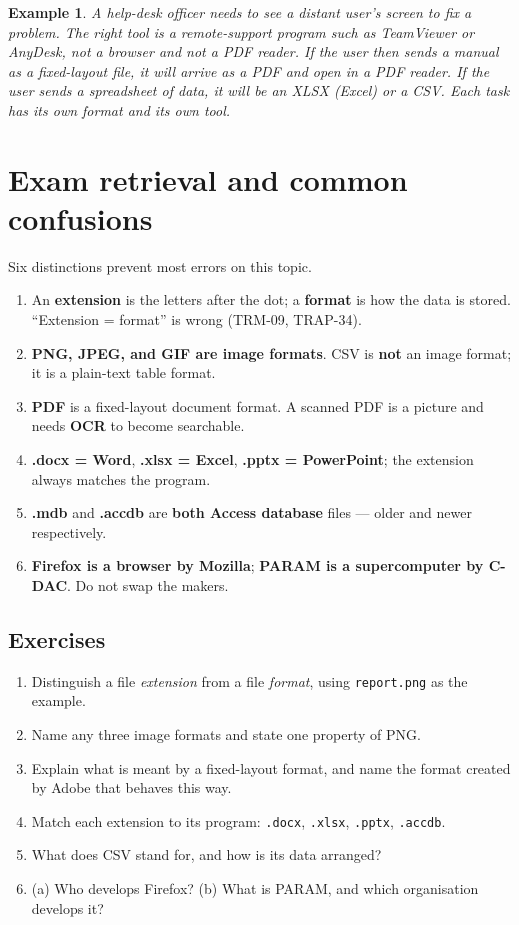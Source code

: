 \documentclass[11pt]{article}
\newtheorem{example}{Example}[section]
\begin{document}
\begin{example}
A help-desk officer needs to see a distant user's screen to fix a problem.
The right tool is a remote-support program such as TeamViewer or AnyDesk,
\emph{not} a browser and \emph{not} a PDF reader. If the user then sends a
manual as a fixed-layout file, it will arrive as a PDF and open in a PDF
reader. If the user sends a spreadsheet of data, it will be an XLSX (Excel)
or a CSV. Each task has its own format and its own tool.
\end{example}

\section{Exam retrieval and common confusions}
Six distinctions prevent most errors on this topic.
\begin{enumerate}
  \item An \textbf{extension} is the letters after the dot; a \textbf{format}
    is how the data is stored. ``Extension = format'' is wrong (TRM-09,
    TRAP-34).
  \item \textbf{PNG, JPEG, and GIF are image formats}. CSV is \textbf{not} an
    image format; it is a plain-text table format.
  \item \textbf{PDF} is a fixed-layout document format. A scanned PDF is a
    picture and needs \textbf{OCR} to become searchable.
  \item \textbf{.docx = Word}, \textbf{.xlsx = Excel}, \textbf{.pptx =
    PowerPoint}; the extension always matches the program.
  \item \textbf{.mdb} and \textbf{.accdb} are \textbf{both Access database}
    files --- older and newer respectively.
  \item \textbf{Firefox is a browser by Mozilla}; \textbf{PARAM is a
    supercomputer by C-DAC}. Do not swap the makers.
\end{enumerate}

\subsection*{Exercises}
\begin{enumerate}[label=\arabic*.]
  \item Distinguish a file \emph{extension} from a file \emph{format}, using
    \texttt{report.png} as the example.
  \item Name any three image formats and state one property of PNG.
  \item Explain what is meant by a fixed-layout format, and name the format
    created by Adobe that behaves this way.
  \item Match each extension to its program: \texttt{.docx},
    \texttt{.xlsx}, \texttt{.pptx}, \texttt{.accdb}.
  \item What does CSV stand for, and how is its data arranged?
  \item (a) Who develops Firefox? (b) What is PARAM, and which organisation
    develops it?
\end{enumerate}
\end{document}
